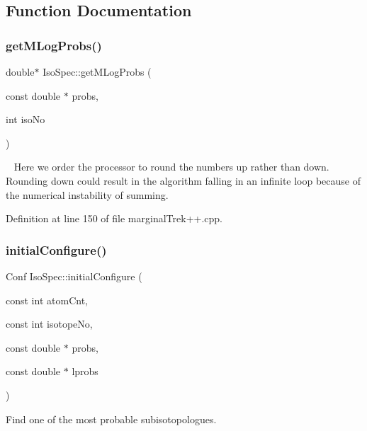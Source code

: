 \subsection{Function Documentation}
\mbox{\label{namespace_iso_spec_a4b68cc6e2f1f4f30b189a5d01153daa4}} 
\subsubsection{\texorpdfstring{get\+M\+Log\+Probs()}{getMLogProbs()}}
{\footnotesize\ttfamily double$\ast$ Iso\+Spec\+::get\+M\+Log\+Probs (\begin{DoxyParamCaption}\item[{const double $\ast$}]{probs,  }\item[{int}]{iso\+No }\end{DoxyParamCaption})}

~\newline
Here we order the processor to round the numbers up rather than down. Rounding down could result in the algorithm falling in an infinite loop because of the numerical instability of summing.

Definition at line 150 of file marginal\+Trek++.\+cpp.

\mbox{\label{namespace_iso_spec_a9abbd881dd3c9347438361a6dd21cef4}} 
\subsubsection{\texorpdfstring{initial\+Configure()}{initialConfigure()}}
{\footnotesize\ttfamily Conf Iso\+Spec\+::initial\+Configure (\begin{DoxyParamCaption}\item[{const int}]{atom\+Cnt,  }\item[{const int}]{isotope\+No,  }\item[{const double $\ast$}]{probs,  }\item[{const double $\ast$}]{lprobs }\end{DoxyParamCaption})}



Find one of the most probable subisotopologues. 

